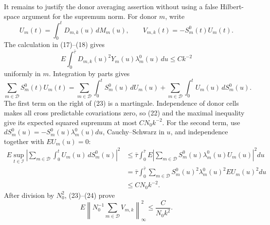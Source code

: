 It remains to justify the donor averaging assertion without using a false Hilbert-space argument for the supremum norm.  For donor \(m\), write
\[
 U_m(t)=\int_0^tD_{m,k}(u)\,dM_m(u),
 \qquad V_{m,k}(t)=-S_m^0(t)U_m(t).
\]
The calculation in (17)--(18) gives
\[
 E\int_0^{\bar\tau}D_{m,k}(u)^2Y_m(u)\lambda_m^0(u)\,du
 \le Ck^{-2}                                                   \tag{22}
\]
uniformly in \(m\).  Integration by parts gives
\[
 \sum_{m\in\mathcal D}S_m^0(t)U_m(t)
 =\sum_{m\in\mathcal D}\int_0^tS_m^0(u)\,dU_m(u)
  +\sum_{m\in\mathcal D}\int_0^tU_m(u)\,dS_m^0(u).          \tag{23}
\]
The first term on the right of (23) is a martingale.  Independence of donor cells makes all cross predictable covariations zero, so (22) and the maximal inequality give its expected squared supremum at most \(CN_0k^{-2}\).  For the second term, use \(dS_m^0(u)=-S_m^0(u)\lambda_m^0(u)du\), Cauchy--Schwarz in \(u\), and independence together with \(EU_m(u)=0\):
\[
 \begin{aligned}
 E\sup_{t\in\mathcal I}
 \left|\sum_{m\in\mathcal D}\int_0^tU_m(u)\,dS_m^0(u)\right|^2
 &\le \bar\tau\int_0^{\bar\tau}
 E\left|\sum_{m\in\mathcal D}S_m^0(u)\lambda_m^0(u)U_m(u)\right|^2du\\
 &=\bar\tau\int_0^{\bar\tau}\sum_{m\in\mathcal D}
 S_m^0(u)^2\lambda_m^0(u)^2EU_m(u)^2du\\
 &\le CN_0k^{-2}.
 \end{aligned}                                                 \tag{24}
\]
After division by \(N_0^2\), (23)--(24) prove
\[
 E\left\|N_0^{-1}\sum_{m\in\mathcal D}V_{m,k}\right\|_\infty^2
 \le \frac{C}{N_0k^2}.                                      \tag{25}
\]

